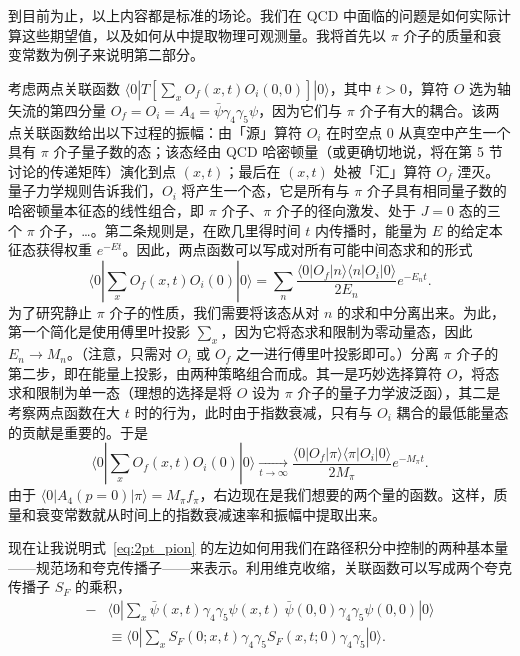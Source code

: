 到目前为止，以上内容都是标准的场论。我们在 QCD 中面临的问题是如何实际计算这些期望值，以及如何从中提取物理可观测量。我将首先以 $\pi$ 介子的质量和衰变常数为例子来说明第二部分。

考虑两点关联函数 $\langle 0| T \left[ \sum_x O_f(x, t) O_i(0, 0) \right] |0\rangle$，其中 $t > 0$，算符 $O$ 选为轴矢流的第四分量 $O_f = O_i = A_4 = \bar{\psi}\gamma_4\gamma_5\psi$，因为它们与 $\pi$ 介子有大的耦合。该两点关联函数给出以下过程的振幅：由「源」算符 $O_i$ 在时空点 $0$ 从真空中产生一个具有 $\pi$ 介子量子数的态；该态经由 QCD 哈密顿量（或更确切地说，将在第 5 节讨论的传递矩阵）演化到点 $(x, t)$；最后在 $(x, t)$ 处被「汇」算符 $O_f$ 湮灭。量子力学规则告诉我们，$O_i$ 将产生一个态，它是所有与 $\pi$ 介子具有相同量子数的哈密顿量本征态的线性组合，即 $\pi$ 介子、$\pi$ 介子的径向激发、处于 $J = 0$ 态的三个 $\pi$ 介子，\ldots。第二条规则是，在欧几里得时间 $t$ 内传播时，能量为 $E$ 的给定本征态获得权重 $e^{-Et}$。因此，两点函数可以写成对所有可能中间态求和的形式
\begin{equation}
  \langle 0| \sum_x O_f(x, t) O_i(0) |0\rangle
  = \sum_n \frac{\langle 0|O_f|n\rangle\langle n|O_i|0\rangle}{2E_n} e^{-E_n t}.
  \label{eq:2pt_spectral}
\end{equation}
为了研究静止 $\pi$ 介子的性质，我们需要将该态从对 $n$ 的求和中分离出来。为此，第一个简化是使用傅里叶投影 $\sum_x$，因为它将态求和限制为零动量态，因此 $E_n \to M_n$。（注意，只需对 $O_i$ 或 $O_f$ 之一进行傅里叶投影即可。）分离 $\pi$ 介子的第二步，即在能量上投影，由两种策略组合而成。其一是巧妙选择算符 $O$，将态求和限制为单一态（理想的选择是将 $O$ 设为 $\pi$ 介子的量子力学波泛函），其二是考察两点函数在大 $t$ 时的行为，此时由于指数衰减，只有与 $O_i$ 耦合的最低能量态的贡献是重要的。于是
\begin{equation}
  \langle 0| \sum_x O_f(x, t) O_i(0) |0\rangle
  \xrightarrow[t\to\infty]{}
  \frac{\langle 0|O_f|\pi\rangle\langle\pi|O_i|0\rangle}{2M_\pi} e^{-M_\pi t}.
  \label{eq:2pt_pion}
\end{equation}
由于 $\langle 0|A_4(p = 0)|\pi\rangle = M_\pi f_\pi$，右边现在是我们想要的两个量的函数。这样，质量和衰变常数就从时间上的指数衰减速率和振幅中提取出来。

现在让我说明式~\eqref{eq:2pt_pion} 的左边如何用我们在路径积分中控制的两种基本量——规范场和夸克传播子——来表示。利用维克收缩，关联函数可以写成两个夸克传播子 $S_F$ 的乘积，
\begin{equation}
  \begin{aligned}
    -&\langle 0| \sum_x \bar{\psi}(x, t)\gamma_4\gamma_5\psi(x, t)\ \bar{\psi}(0, 0)\gamma_4\gamma_5\psi(0, 0)|0\rangle \\
    &\equiv \langle 0| \sum_x S_F(0; x, t)\gamma_4\gamma_5 S_F(x, t; 0)\gamma_4\gamma_5|0\rangle.
  \end{aligned}
  \label{eq:wick_local}
\end{equation}


